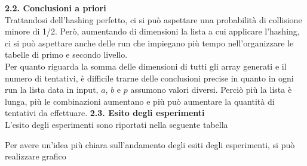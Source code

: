 \documentclass[]{article}
\begin{document}
{\large \textbf{{\Large{2}}.{\small{2}}. Conclusioni a priori}}\\
Trattandosi dell'hashing perfetto, ci si può aspettare una probabilità di collisione minore di 1/2.
Però, aumentando di dimensioni la lista a cui applicare l'hashing, ci si può aspettare anche delle run che impiegano più tempo 
nell'organizzare le tabelle di primo e secondo livello.\\
Per quanto riguarda la somma delle dimensioni di tutti gli array generati e il numero di tentativi, è difficile trarne delle conclusioni precise in quanto in ogni run
la lista data in input, $a$, $b$ e $p$ assumono valori diversi. 
Perciò più la lista è lunga, più le combinazioni aumentano e più può aumentare la quantità di tentativi da effettuare.
\newpage
{\large \textbf{{\Large{2}}.{\small{3}}. Esito degli esperimenti}}\\
L'esito degli esperimenti sono riportati nella seguente tabella
\begin{table}[H]
\end{table}
Per avere un'idea più chiara sull'andamento degli esiti degli esperimenti, si può realizzare grafico\\
\end{document}
